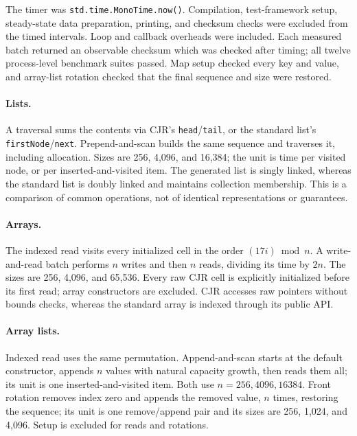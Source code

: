 The timer was \texttt{std.time.MonoTime.now()}.  Compilation, test-framework
setup, steady-state data preparation, printing, and checksum checks were
excluded from the timed intervals.  Loop and callback overheads were
included.  Each measured batch returned an observable checksum which was
checked after timing; all twelve process-level benchmark suites passed.
Map setup checked every key and value, and array-list rotation checked that
the final sequence and size were restored.

\paragraph{Lists.} A traversal sums the contents via CJR's
\texttt{head}/\texttt{tail}, or the standard list's
\texttt{firstNode}/\texttt{next}.  Prepend-and-scan builds the same sequence
and traverses it, including allocation.  Sizes are 256, 4,096, and 16,384;
the unit is time per visited node, or per inserted-and-visited item.
The generated list is singly linked, whereas the standard list is doubly
linked and maintains collection membership.  This is a comparison of
common operations, not of identical representations or guarantees.

\paragraph{Arrays.} The indexed read visits every initialized cell in the
order $(17i) \bmod n$.  A write-and-read batch performs $n$ writes and then
$n$ reads, dividing its time by $2n$.  The sizes are 256, 4,096, and 65,536.
Every raw CJR cell is explicitly initialized before its first read; array
constructors are excluded.  CJR accesses raw pointers without bounds
checks, whereas the standard array is indexed through its public API.

\paragraph{Array lists.} Indexed read uses the same permutation.
Append-and-scan starts at the default constructor, appends $n$ values with
natural capacity growth, then reads them all; its unit is one
inserted-and-visited item.  Both use $n=256,4096,16384$.
Front rotation removes index zero and appends the removed value, $n$ times,
restoring the sequence; its unit is one remove/append pair and its sizes
are 256, 1,024, and 4,096.  Setup is excluded for reads and rotations.

